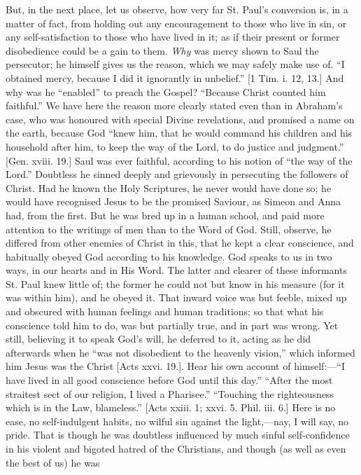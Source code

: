 But, in the next place, let us observe, how very far St. Paul's
conversion is, in a matter of fact, from holding out any encouragement
to those who live in sin, or any self-satisfaction to those who have
lived in it; as if their present or former disobedience could be a
gain to them.
\emph{Why} was mercy shown to Saul the persecutor; he himself gives us
the reason, which we may safely make use of. ``I obtained mercy,
because I did it ignorantly in unbelief.'' [1 Tim. i. 12, 13.] And
why was he ``enabled'' to preach the Gospel? ``Because
Christ counted him faithful.'' We have here the reason more
clearly stated even than in Abraham's case, who was honoured with
special Divine revelations, and promised a name on the earth, because
God ``knew him, that he would command his children and his
household after him, to keep the way of the Lord, to do justice and
judgment.'' [Gen. xviii. 19.] Saul was ever faithful, according to
his notion of ``the way of the Lord.'' Doubtless he sinned
deeply and grievously in persecuting the followers of Christ. Had he
known the Holy Scriptures, he never would have done so; he would have
recognised Jesus to be the promised Saviour, as Simeon and Anna had,
from the first. But he was bred up in a human school, and paid more
attention to the writings of men than to the Word of God. Still,
observe, he differed from other enemies of Christ in this, that he
kept a clear conscience, and habitually obeyed God according to his
knowledge. God speaks to us in two ways, in our hearts and in His
Word. The latter and clearer of these informants St. Paul knew little
of; the former he could not but know in his measure (for it was within
him), and he obeyed it. That inward voice was but feeble, mixed up and
obscured with human feelings and human traditions; so that what his
conscience told him to do, was but partially true, and in part was
wrong. Yet still, believing it to speak God's will, he deferred to it,
acting as he did afterwards when he ``was not disobedient to the
heavenly vision,'' which informed him Jesus was the Christ [Acts
xxvi. 19.]. Hear his own account of himself:—``I have lived in
all good conscience before God until this day.'' ``After the
most straitest sect of our religion, I lived a Pharisee.''
``Touching the righteousness which is in the Law, blameless.''
[Acts xxiii. 1; xxvi. 5. Phil. iii. 6.] Here is no ease, no
self-indulgent habits, no wilful sin against the light,—nay, I will
say, no pride. That is though he was doubtless influenced by much
sinful self-confidence in his violent and bigoted hatred of the
Christians, and though (as well as even the best of us) he was
